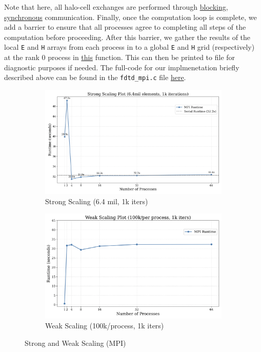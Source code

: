 \documentclass[a4paper,10pt]{article}
\begin{document}
\begin{multicols}{2}
Note that here, all halo-cell exchanges are performed through \underline{blocking, synchronous} communication. Finally, once the computation loop is complete, we add a barrier to ensure that all processes agree to completing all steps of the computation before proceeding. After this barrier, we gather the results of the local \verb|E| and \verb|H| arrays from each process in to a global \verb|E| and \verb|H| grid (respectively) at the rank 0 process in \href{https://github.com/paulmyr/DD2356-MethodsHPC/blob/master/5_project/3_mpi/fdtd_mpi.c#L108}{this} function. This can then be printed to file for diagnostic purposes if needed. The full-code for our implmenetation briefly described above can be found in the \verb|fdtd_mpi.c| file \href{https://github.com/paulmyr/DD2356-MethodsHPC/blob/master/5_project/3_mpi/fdtd_mpi.c}{here}.
\end{multicols}

\begin{figure}
     \centering
     \begin{subfigure}[b]{0.45\textwidth}
         \centering
         \includegraphics[width=\textwidth]{../images/3_mpi/strong_scaling.png}
         \caption{Strong Scaling (6.4 mil, 1k iters)}
         \label{fig:3_mpi_strong_scaling}
     \end{subfigure}
     \hfill
     \begin{subfigure}[b]{0.45\textwidth}
         \centering
         \includegraphics[width=\textwidth]{../images/3_mpi/weak_scaling.png}
         \caption{Weak Scaling (100k/process, 1k iters)}
         \label{fig:3_mpi_weak_scaling}
     \end{subfigure}
     \caption{Strong and Weak Scaling (MPI) }
     \label{fig:3_mpi_strong_weak}
\end{figure}
\end{document}
